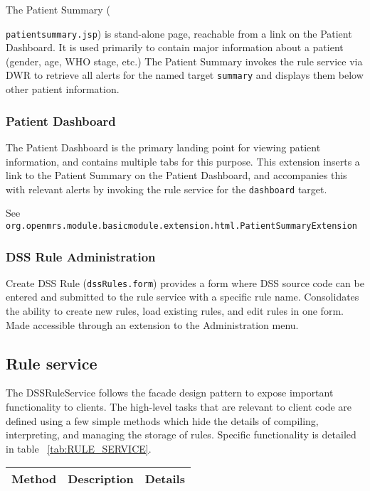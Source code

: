 \documentclass[12pt,letterpaper]{article}
\begin{document}
The Patient Summary ({\texttt{patientsummary.jsp}) is  stand-alone page, reachable from a link on the Patient Dashboard. It is used primarily to contain major information about a patient (gender, age, WHO stage, etc.) The Patient Summary invokes the rule service via DWR to retrieve all alerts for the named target  \texttt{summary} and displays them below other patient information. 

\subsubsection{Patient Dashboard} 

The Patient Dashboard is the primary landing point for viewing patient information, and contains multiple tabs for this purpose. This extension inserts a link to the Patient Summary on the Patient Dashboard, and accompanies this with relevant alerts by invoking the rule service for the \texttt{dashboard} target.

See \texttt{org.openmrs.module.basicmodule.extension.html.PatientSummaryExtension}

\subsubsection {DSS Rule Administration}
Create DSS Rule (\texttt{dssRules.form}) provides a form where DSS source code can be entered and submitted to the rule service with a specific rule name. Consolidates the ability to create new rules, load existing rules, and edit rules in one form. Made accessible through an extension to the Administration menu.

\subsection{Rule service}

The DSSRuleService follows the facade design pattern to expose important functionality to clients. The high-level tasks that are relevant to client code are defined using a few simple methods which hide the details of compiling, interpreting, and managing the storage of rules. Specific functionality is detailed in table ~\ref{tab:RULE_SERVICE}.

\begin{table}
\begin{center}
\begin{tabular}{ l | p{1in} | p{2in} }
Method & Description & Details \\ \hline


\end{tabular}
\end{center}
\end{table}}
\end{document}
